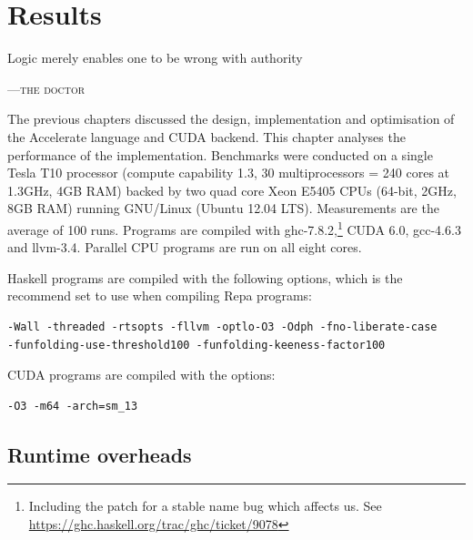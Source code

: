 %
%

\chapter{Results}
\label{ch:results}


\epigraph{Logic merely enables one to be wrong with authority}%
{\textsc{---the doctor}} %


The previous chapters discussed the design, implementation and optimisation of
the Accelerate language and CUDA backend. This chapter analyses the performance
of the implementation. Benchmarks were conducted on a single Tesla T10 processor
(compute capability 1.3, 30 multiprocessors = 240 cores at 1.3GHz, 4GB RAM)
backed by two quad core Xeon E5405 CPUs (64-bit, 2GHz, 8GB RAM) running
GNU/Linux (Ubuntu 12.04 LTS). Measurements are the average of 100 runs. Programs
are compiled with ghc-7.8.2,\footnote{Including the patch for a stable name bug
which affects us. See \url{https://ghc.haskell.org/trac/ghc/ticket/9078}} CUDA
6.0, gcc-4.6.3 and llvm-3.4. Parallel CPU programs are run on all eight cores.

Haskell programs are compiled with the following options, which is the recommend
set to use when compiling Repa programs:
%
\begin{lstlisting}
-Wall -threaded -rtsopts -fllvm -optlo-O3 -Odph -fno-liberate-case
-funfolding-use-threshold100 -funfolding-keeness-factor100
\end{lstlisting}
%
CUDA programs are compiled with the options:
%
\begin{lstlisting}
-O3 -m64 -arch=sm_13
\end{lstlisting}


\section{Runtime overheads}

